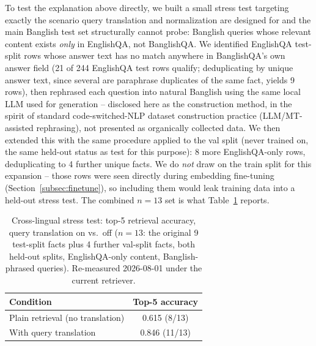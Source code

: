 \documentclass[a4paper,twoside]{article}
\begin{document}
To test the explanation above directly, we built a small stress test targeting exactly the scenario query translation and normalization are designed for and the main Banglish test set structurally cannot probe: Banglish queries whose relevant content exists \emph{only} in EnglishQA, not BanglishQA. We identified EnglishQA test-split rows whose answer text has no match anywhere in BanglishQA's own answer field (21 of 244 EnglishQA test rows qualify; deduplicating by unique answer text, since several are paraphrase duplicates of the same fact, yields 9 rows), then rephrased each question into natural Banglish using the same local LLM used for generation -- disclosed here as the construction method, in the spirit of standard code-switched-NLP dataset construction practice (LLM/MT-assisted rephrasing), not presented as organically collected data. We then extended this with the same procedure applied to the val split (never trained on, the same held-out status as test for this purpose): 8 more EnglishQA-only rows, deduplicating to 4 further unique facts. We do \emph{not} draw on the train split for this expansion -- those rows were seen directly during embedding fine-tuning (Section~\ref{subsec:finetune}), so including them would leak training data into a held-out stress test. The combined $n=13$ set is what Table~\ref{tab:crosslingual-stress} reports.

\begin{table}[t]
\caption{Cross-lingual stress test: top-5 retrieval accuracy, query translation on vs.\ off ($n=13$: the original 9 test-split facts plus 4 further val-split facts, both held-out splits, EnglishQA-only content, Banglish-phrased queries). Re-measured 2026-08-01 under the current retriever.}\label{tab:crosslingual-stress} \centering
\begin{tabular}{|l|c|}
\hline
Condition & Top-5 accuracy \\
\hline
Plain retrieval (no translation) & 0.615 (8/13) \\
With query translation & 0.846 (11/13) \\
\hline
\end{tabular}
\end{table}
\end{document}
